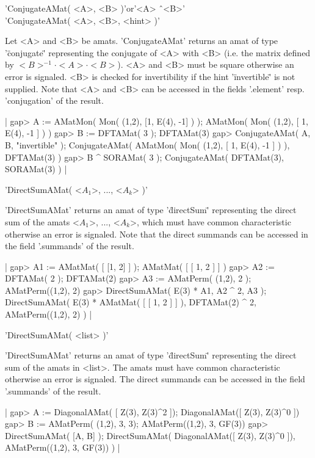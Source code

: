
'ConjugateAMat( <A>, <B> )'\quad or\quad '<A> \^\ <B>'\\
'ConjugateAMat( <A>, <B>, <hint> )'

Let <A> and <B> be amats. 'ConjugateAMat' returns 
an amat of type '\"conjugate\"' representing the conjugate of 
<A> with <B> (i.e. the matrix defined by $<B>^{-1}\cdot<A>\cdot<B>$).
<A> and <B> must be square otherwise an error is signaled. 
<B> is checked for invertibility if the
hint '\"invertible\"' is not supplied.
Note that <A> and <B> can be accessed in the fields '.element' 
resp. 'conjugation' of the result.

|    gap> A := AMatMon( Mon( (1,2), [1, E(4), -1] ) );
    AMatMon( Mon(
      (1,2),
      [ 1, E(4), -1 ]
    ) )
    gap> B := DFTAMat( 3 );
    DFTAMat(3)
    gap> ConjugateAMat( A, B, "invertible" );
    ConjugateAMat(
      AMatMon( Mon(
        (1,2),
        [ 1, E(4), -1 ]
      ) ),
      DFTAMat(3)
    )
    gap> B ^ SORAMat( 3 );
    ConjugateAMat(
      DFTAMat(3),
      SORAMat(3)
    ) |


'DirectSumAMat( <$A_1$>, ..., <$A_k$> )'

'DirectSumAMat' returns an amat of type '\"directSum\"' representing
the direct sum of the amats <$A_1$>, ..., <$A_k$>, which must have 
common characteristic otherwise an error is signaled. Note that the direct 
summands can be accessed in the field '.summands' of the result.

|    gap> A1 := AMatMat( [ [1, 2] ] );
    AMatMat(
      [ [ 1, 2 ] ]
    )
    gap> A2 := DFTAMat( 2 );
    DFTAMat(2)
    gap> A3 := AMatPerm( (1,2), 2 );
    AMatPerm((1,2), 2)
    gap> DirectSumAMat( E(3) * A1, A2 ^ 2, A3 );
    DirectSumAMat(
      E(3) * AMatMat( [ [ 1, 2 ] ] ),
      DFTAMat(2) ^ 2,
      AMatPerm((1,2), 2)
    ) |

'DirectSumAMat( <list> )'

'DirectSumAMat' returns an amat of type '\"directSum\"' representing
the direct sum of the amats in <list>. The amats must have common
characteristic otherwise an error is signaled. The direct 
summands can be accessed in the field '.summands' of the result.

|    gap> A := DiagonalAMat( [ Z(3), Z(3)^2 ]);
    DiagonalAMat([ Z(3), Z(3)^0 ])
    gap> B := AMatPerm( (1,2), 3, 3);
    AMatPerm((1,2), 3, GF(3))
    gap> DirectSumAMat( [A, B] );    
    DirectSumAMat(
      DiagonalAMat([ Z(3), Z(3)^0 ]),
      AMatPerm((1,2), 3, GF(3))
    ) |

